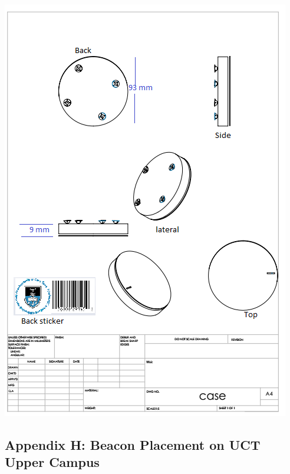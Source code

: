 \newpage
\begin{center}
\includegraphics[scale=1.3]{data/mechanical/a2.png}
\end{center}

\newpage
\vspace*{\fill}
\begin{center}
\subsection*{Appendix H: Beacon Placement on UCT Upper Campus}
\end{center}
\vspace*{\fill}

